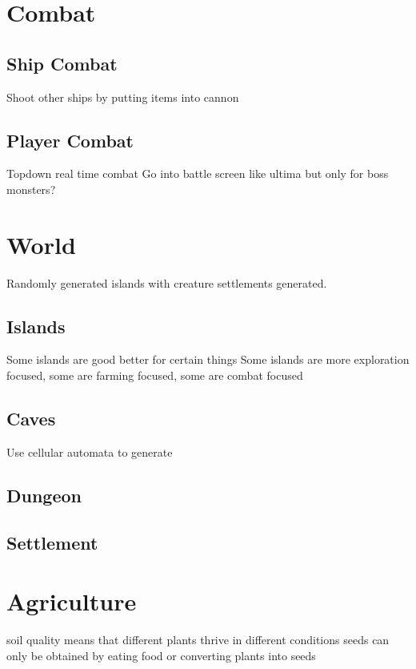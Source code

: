 \documentclass[a4paper]{scrreprt}
\begin{document}
\section{Combat}

\subsection{Ship Combat}
Shoot other ships by putting items into cannon

\subsection{Player Combat}
Topdown real time combat
\newline Go into battle screen like ultima but only for boss monsters?


\section{World}
Randomly generated islands with creature settlements generated.

\subsection{Islands}
Some islands are good better for certain things
\newline Some islands are more exploration focused, some are farming focused, some are combat focused

\subsection{Caves}
Use cellular automata to generate

\subsection{Dungeon}
\subsection{Settlement}


\section{Agriculture}
soil quality means that different plants thrive in different conditions
\newline seeds can only be obtained by eating food or converting plants into seeds
\end{document}
